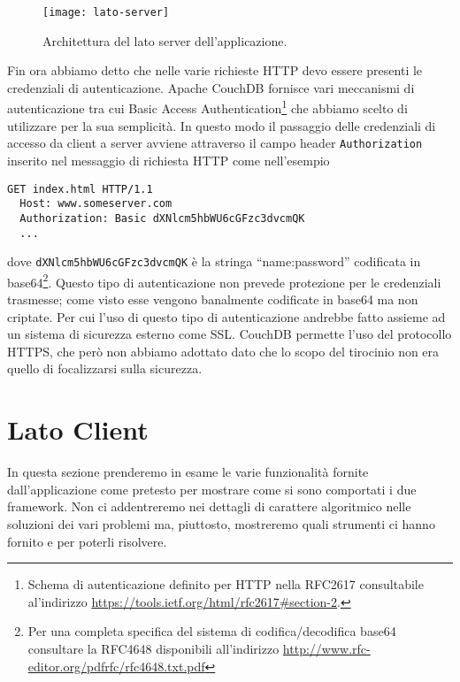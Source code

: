         \begin{figure}[h]
            \centering
            \texttt{[image: lato-server]}
            \caption{
                Architettura del lato server dell'applicazione.
            }
            \label{fig:latoserver}
        \end{figure}

        Fin ora abbiamo detto che nelle varie richieste HTTP devo essere presenti
        le credenziali di autenticazione. Apache CouchDB\texttrademark{} fornisce
        vari meccanismi di autenticazione tra cui Basic Access Authentication\footnote{
        Schema di autenticazione definito per HTTP nella RFC2617 consultabile al'indirizzo
        \url{https://tools.ietf.org/html/rfc2617\#section-2}.}
        che abbiamo scelto di utilizzare per la sua semplicità. In questo modo il
        passaggio delle credenziali di accesso da client a server avviene attraverso
        il campo header \texttt{Authorization} inserito nel messaggio di richiesta HTTP
        come nell'esempio
        \begin{lstlisting}[language=http]
  GET index.html HTTP/1.1
  Host: www.someserver.com
  Authorization: Basic dXNlcm5hbWU6cGFzc3dvcmQK
  ...
        \end{lstlisting}
        dove \texttt{dXNlcm5hbWU6cGFzc3dvcmQK} è la stringa ``name:password''
        codificata in base64\footnote{Per una completa specifica del sistema di
        codifica/decodifica base64 consultare la RFC4648 disponibili all'indirizzo
        \url{http://www.rfc-editor.org/pdfrfc/rfc4648.txt.pdf}}.
        Questo tipo di autenticazione non prevede protezione per le credenziali
        trasmesse; come visto esse vengono banalmente codificate in base64 ma non
        criptate. Per cui l'uso di questo tipo di
        autenticazione andrebbe fatto assieme ad un sistema di sicurezza esterno
        come SSL\citep{Web:RFC2617}. CouchDB permette l'uso del protocollo HTTPS,
        che però non abbiamo adottato dato che lo scopo del tirocinio non era quello di focalizzarsi
        sulla sicurezza.


    \section{Lato Client}
        In questa sezione prenderemo in esame le varie funzionalità fornite
        dall'applicazione come pretesto per mostrare come si sono
        comportati i due framework. Non ci addentreremo
        nei dettagli di carattere algoritmico nelle soluzioni dei vari problemi ma,
        piuttosto, mostreremo quali strumenti ci hanno fornito \tisdk{} e \pg{}
        per poterli risolvere.

